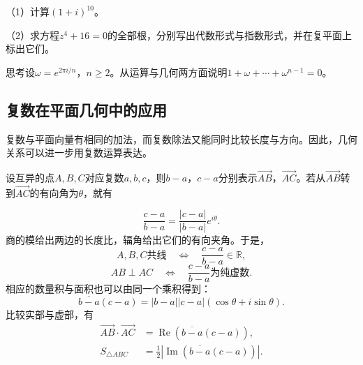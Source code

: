 \begin{samepage}
\begin{example}
（1）计算\(\left( 1 + i \right)^{10}\)。
\par\nopagebreak[4]

（2）求方程\(z^{4} + 16 = 0\)的全部根，分别写出代数形式与指数形式，并在复平面上标出它们。
\end{example}
\par
\end{samepage}

{\kaiti{}思考\quad 设\(\omega = e^{2 \pi i / n}\)，\(n \ge 2\)。从运算与几何两方面说明\(1 + \omega + \cdots + \omega^{n - 1} = 0\)。}

\subsection{复数在平面几何中的应用}
复数与平面向量有相同的加法，而复数除法又能同时比较长度与方向。因此，几何关系可以进一步用复数运算表达。

\begin{samepage}
设互异的点\(A , B , C\)对应复数\(a , b , c\)，则\(b - a\)，\(c - a\)分别表示\(\vec{A B}\)，\(\vec{A C}\)。若从\(\vec{A B}\)转到\(\vec{A C}\)的有向角为\(\theta\)，就有
\par
\end{samepage}
\begin{equation}
    \frac{c - a}{b - a} = \frac{\left| c - a \right|}{\left| b - a \right|} e^{i \theta} .
\end{equation}
商的模给出两边的长度比，辐角给出它们的有向夹角。于是，
\begin{equation}
    A , B , C\text{共线} \quad \Longleftrightarrow \quad \frac{c - a}{b - a} \in \mathbb{R} ,
\end{equation}
\begin{equation}
    A B \perp A C \quad \Longleftrightarrow \quad \frac{c - a}{b - a}\text{为纯虚数} .
\end{equation}
相应的数量积与面积也可以由同一个乘积得到：
\begin{equation}
    \overline{b - a} \left( c - a \right)
    = \left| b - a \right| \left| c - a \right| \left( \cos \theta + i \sin \theta \right) .
\end{equation}
比较实部与虚部，有
\begin{align}
    \vec{A B} \cdot \vec{A C} &= \operatorname{Re} \left( \overline{b - a} \left( c - a \right) \right) , \\
    S_{\triangle A B C} &= \frac{1}{2} \left| \operatorname{Im} \left( \overline{b - a} \left( c - a \right) \right) \right| .
\end{align}

